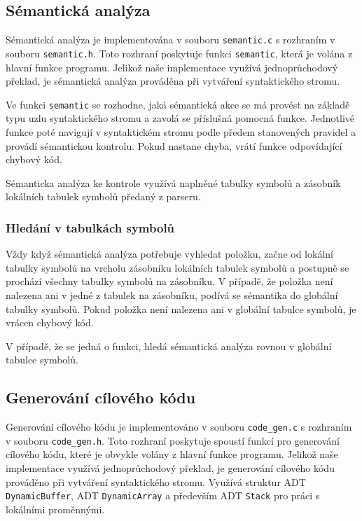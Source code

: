 \documentclass[a4paper, 11pt]{article}
\begin{document}
	\subsection{Sémantická analýza}
	Sémantická analýza je implementována v souboru \texttt{semantic.c} s rozhraním v souboru \texttt{semantic.h}. Toto rozhraní poskytuje funkci \texttt{semantic}, která je volána z hlavní funkce programu. Jelikož naše implementace využívá jednoprůchodový překlad, je sémantická analýza prováděna při vytváření syntaktického stromu.
	\par\noindent Ve funkci \texttt{semantic} se rozhodne, jaká sémantická akce se má provést na základě typu uzlu syntaktického stromu a zavolá se příslušná pomocná funkce. Jednotlivé funkce poté navigují v syntaktickém stromu podle předem stanovených pravidel a provádí sémantickou kontrolu. Pokud nastane chyba, vrátí funkce odpovídající chybový kód.
	\par\noindent Sémanticka analýza ke kontrole využívá naplněné tabulky symbolů a zásobník lokálních tabulek symbolů předaný z parseru.
	\subsubsection{Hledání v tabulkách symbolů}
	Vždy když sémantická analýza potřebuje vyhledat položku, začne od lokální tabulky symbolů na vrcholu zásobníku lokálních tabulek symbolů a postupně se prochází všechny tabulky symbolů na zásobníku. V případě, že položka není nalezena ani v jedné z tabulek na zásobníku, podívá se sémantika do globální tabulky symbolů.
	Pokud položka není nalezena ani v globální tabulce symbolů, je vrácen chybový kód.
	\par\noindent V případě, že se jedná o funkci, hledá sémantická analýza rovnou v globální tabulce symbolů. 

	\subsection{Generování cílového kódu}
	\label{sec:gen}

	Generování cílového kódu je implementováno v souboru \texttt{code\_gen.c} s rozhraním v souboru \texttt{code\_gen.h}. Toto rozhraní poskytuje spoustí funkcí pro generování cílového kódu, které je obvykle volány z hlavní funkce programu. Jelikož naše implementace využívá jednoprůchodový překlad, je generování cílového kódu prováděno při vytváření syntaktického stromu.
	Využívá struktur ADT \texttt{DynamicBuffer}, ADT \texttt{DynamicArray} a především ADT \texttt{Stack} pro práci s lokálními proměnnými. 
\end{document}
